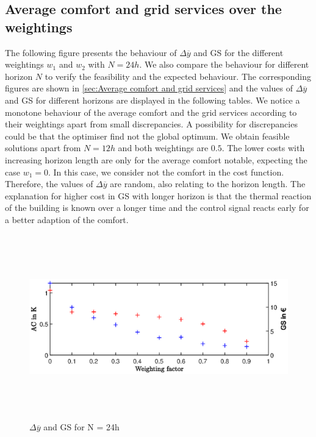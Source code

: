 \subsection{Average comfort and grid services over the weightings}
\label{subsec:Average comfort and grid services over the weightings}
The following figure presents the behaviour of $\Delta \overline{y}$ and GS for the different weightings $w_\text{1}$ and $w_\text{2}$ with $N = 24h$. We also compare the behaviour for different horizon $N$ to verify the feasibility and the expected behaviour. The corresponding figures are shown in \autoref{sec:Average comfort and grid services} and the values of $\Delta \overline{y}$ and GS for different horizons are displayed in the following tables.\newline
We notice a monotone behaviour of the average comfort and the grid services according to their weightings apart from small discrepancies. A possibility for discrepancies could be that the optimiser find not the global optimum. We obtain feasible solutions apart from $N=12 h$ and both weightings are $0.5$. The lower costs with increasing horizon length are only for the average comfort notable, expecting the case $w_\text{1}=0$. In this case, we consider not the comfort in the cost function. Therefore, the values of $\Delta \overline{y}$ are random, also relating to the horizon length.\newline
The explanation for higher cost in GS with longer horizon is that the thermal reaction of the building is known over a longer time and the control signal reacts early for a better adaption of the comfort.
    \begin{figure}[h]
            \centering
            \includegraphics[width=15cm,height=8cm]{figure/AC_und_GS_24h.eps}
           \caption{$\Delta \overline{y}$ and GS for N = 24h}
            \label{fig:AC_und_GS_24h}
    \end{figure}
    
